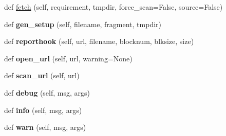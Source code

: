 \begin{DoxyCompactItemize}
\item 
def \hyperlink{classsetuptools_1_1package__index_1_1_package_index_a4fa8a0112703f75c6af17996ce6eb66e}{fetch} (self, requirement, tmpdir, force\+\_\+scan=False, source=False)
\item 
\mbox{\label{classsetuptools_1_1package__index_1_1_package_index_a62fc46189fe3177880c7a8a870189d2f}} 
def {\bfseries gen\+\_\+setup} (self, filename, fragment, tmpdir)
\item 
\mbox{\label{classsetuptools_1_1package__index_1_1_package_index_ab755a72708d533f6022c9a1b8812eed6}} 
def {\bfseries reporthook} (self, url, filename, blocknum, blksize, size)
\item 
\mbox{\label{classsetuptools_1_1package__index_1_1_package_index_aa5e2a575613dde93b7fc71ddc29e2ed1}} 
def {\bfseries open\+\_\+url} (self, url, warning=None)
\item 
\mbox{\label{classsetuptools_1_1package__index_1_1_package_index_a34fd05e6bd70cb5fb45df6089a9a0d88}} 
def {\bfseries scan\+\_\+url} (self, url)
\item 
\mbox{\label{classsetuptools_1_1package__index_1_1_package_index_a4d45c347357b1bb87fc68aaf037aaf6d}} 
def {\bfseries debug} (self, msg, args)
\item 
\mbox{\label{classsetuptools_1_1package__index_1_1_package_index_aaf8b3976306c8eaa1f0c8c70c080efc1}} 
def {\bfseries info} (self, msg, args)
\item 
\mbox{\label{classsetuptools_1_1package__index_1_1_package_index_a6942a7d171f22524a12f651b67a7c1a8}} 
def {\bfseries warn} (self, msg, args)
\end{DoxyCompactItemize}
